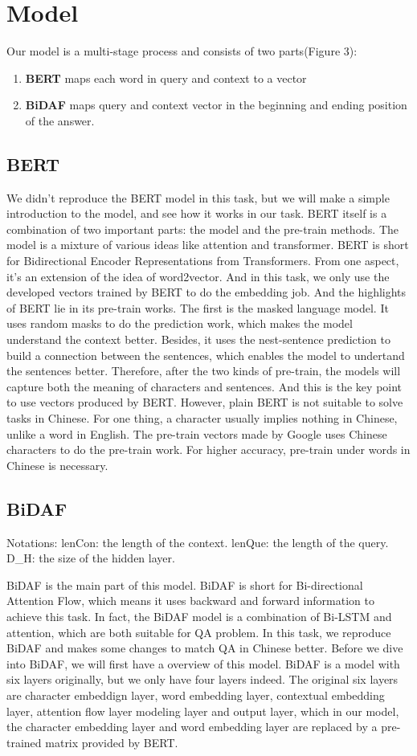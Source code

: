 \documentclass{article}
\begin{document}
\section{Model}
\noindent Our model is a multi-stage process and consists of two parts(Figure 3):\\
\begin{enumerate}
	\item \textbf{BERT} maps each word in query and context to a vector  
	\item \textbf{BiDAF} maps query and context vector in the beginning and ending position of the answer.
\end{enumerate}
\subsection{BERT}
We didn't reproduce the BERT model in this task, but we will make a simple introduction to the model, and see how it works in our task. 
BERT itself is a combination of two important parts: the model and the pre-train methods. 
The model is a mixture of various ideas like attention and transformer. BERT is short for Bidirectional Encoder Representations from Transformers. From one aspect, it's an extension of the idea of word2vector. And in this task, we only use the developed vectors trained by BERT to do the embedding job. 
And the highlights of BERT lie in its pre-train works. The first is the masked language model. It uses random masks to do the prediction work, which makes the model understand the context better. Besides, it uses the nest-sentence prediction to build a connection between the sentences, which enables the model to undertand the sentences better. Therefore, after the two kinds of pre-train, the models will capture both the meaning of characters and sentences. And this is the key point to use vectors produced by BERT.
However, plain BERT is not suitable to solve tasks in Chinese. For one thing, a character usually implies nothing in Chinese, unlike a word in English. The pre-train vectors made by Google uses Chinese characters to do the pre-train work. For higher accuracy, pre-train under words in Chinese is necessary.
\subsection{BiDAF}
Notations: 
lenCon: the length of the context.
lenQue: the length of the query.
D_H: the size of the hidden layer.

BiDAF is the main part of this model. BiDAF is short for Bi-directional Attention Flow, which means it uses backward and forward information to achieve this task. In fact, the BiDAF model is a combination of Bi-LSTM and attention, which are both suitable for QA problem.
In this task, we reproduce BiDAF and makes some changes to match QA in Chinese better. Before we dive into BiDAF, we will first have a overview of this model. BiDAF is a model with six layers originally, but we only have four layers indeed. The original six layers are character embeddign layer, word embedding layer, contextual embedding layer, attention flow layer modeling layer and output layer, which in our model, the character embedding layer and word embedding layer are replaced by a pre-trained matrix provided by BERT. 
\end{document}
